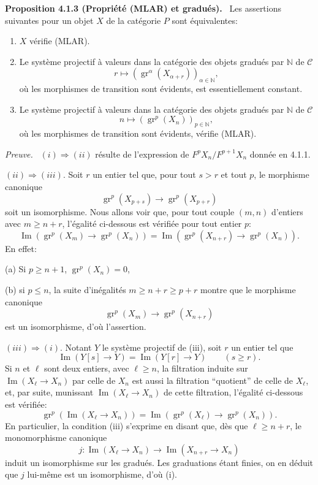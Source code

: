 \documentclass[11pt]{article}
\providecommand{\NN}{\mathbb{N}}
\newenvironment{statement}[1]{\par\medskip\noindent\textbf{#1.}\ }{\par\medskip}
\newenvironment{prooftext}[1][Proof]{\par\noindent\emph{#1.}\ }{\par\medskip}
\providecommand{\gr}{\operatorname{gr}}
\providecommand{\NN}{\mathbb N}
\providecommand{\cC}{\mathcal C}
\providecommand{\Im}{\operatorname{Im}}
\providecommand{\gr}{\operatorname{gr}}
\renewcommand{\Im}{\operatorname{Im}}
\providecommand{\gr}{\operatorname{gr}}
\providecommand{\Im}{\operatorname{Im}}
\providecommand{\cC}{\mathcal C}
\begin{document}
\begin{statement}{Proposition 4.1.3 (Propriété (MLAR) et gradués)}
Les assertions suivantes pour un objet $X$ de la catégorie $P$ sont équivalentes:
\begin{enumerate}[label=(\roman*)]
\item $X$ vérifie (MLAR).
\item Le système projectif à valeurs dans la catégorie des objets gradués par $\NN$ de $\cC$
\[
r\longmapsto (\gr^\alpha(X_{\alpha+r}))_{\alpha\in\NN},
\]
où les morphismes de transition sont évidents, est essentiellement constant.
\item Le système projectif à valeurs dans la catégorie des objets gradués par $\NN$ de $\cC$
\[
n\longmapsto (\gr^p(X_n))_{p\in\NN},
\]
où les morphismes de transition sont évidents, vérifie (MLAR).
\end{enumerate}
\end{statement}

\begin{prooftext}[Preuve]
$(i)\Rightarrow(ii)$ résulte de l'expression de $F^pX_n/F^{p+1}X_n$ donnée en 4.1.1.

$(ii)\Rightarrow(iii)$. Soit $r$ un entier tel que, pour tout $s>r$ et tout $p$, le morphisme canonique
\[
\gr^p(X_{p+s})\longrightarrow \gr^p(X_{p+r})
\]
soit un isomorphisme. Nous allons voir que, pour tout couple $(m,n)$ d'entiers avec $m\ge n+r$, l'égalité ci-dessous est vérifiée pour tout entier $p$:
\[
\Im(\gr^p(X_m)\to\gr^p(X_n))=
\Im(\gr^p(X_{n+r})\to\gr^p(X_n)).
\]
En effet:

(a) Si $p\ge n+1$, $\gr^p(X_n)=0$,

(b) si $p\le n$, la suite d'inégalités $m\ge n+r\ge p+r$ montre que le morphisme canonique
\[
\gr^p(X_m)\longrightarrow\gr^p(X_{n+r})
\]
est un isomorphisme, d'où l'assertion.

$(iii)\Rightarrow(i)$. Notant $Y$ le système projectif de (iii), soit $r$ un entier tel que
\[
\Im(Y[s]\to Y)=\Im(Y[r]\to Y)\qquad(s\ge r).
\]
Si $n$ et $\ell$ sont deux entiers, avec $\ell\ge n$, la filtration induite sur $\Im(X_\ell\to X_n)$ par celle de $X_n$ est aussi la filtration ``quotient'' de celle de $X_\ell$, et, par suite, munissant $\Im(X_\ell\to X_n)$ de cette filtration, l'égalité ci-dessous est vérifiée:
\[
\gr^p(\Im(X_\ell\to X_n))=
\Im(\gr^p(X_\ell)\to\gr^p(X_n)).
\]
En particulier, la condition (iii) s'exprime en disant que, dès que $\ell\ge n+r$, le monomorphisme canonique
\[
j:\Im(X_\ell\to X_n)\longrightarrow\Im(X_{n+r}\to X_n)
\]
induit un isomorphisme sur les gradués. Les graduations étant finies, on en déduit que $j$ lui-même est un isomorphisme, d'où (i).
\end{prooftext}
\end{document}
